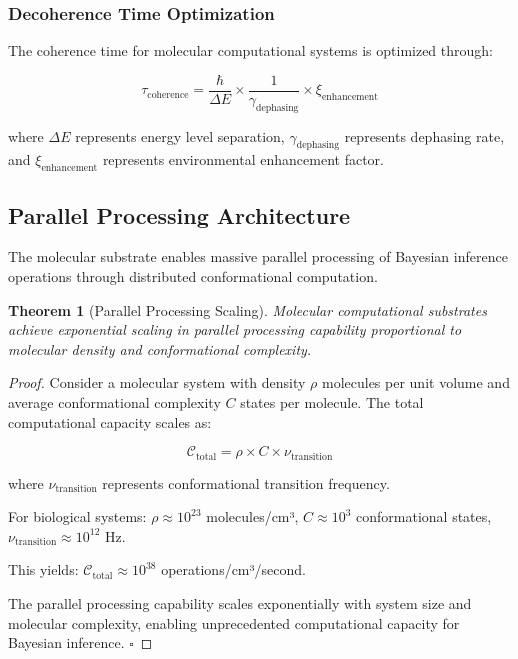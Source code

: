 \documentclass[12pt,a4paper]{article}
\newtheorem{theorem}{Theorem}[section]
\begin{document}
\subsubsection{Decoherence Time Optimization}

The coherence time for molecular computational systems is optimized through:

\begin{equation}
\tau_{\text{coherence}} = \frac{\hbar}{\Delta E} \times \frac{1}{\gamma_{\text{dephasing}}} \times \xi_{\text{enhancement}}
\end{equation}

where $\Delta E$ represents energy level separation, $\gamma_{\text{dephasing}}$ represents dephasing rate, and $\xi_{\text{enhancement}}$ represents environmental enhancement factor.

\subsection{Parallel Processing Architecture}

The molecular substrate enables massive parallel processing of Bayesian inference operations through distributed conformational computation.

\begin{theorem}[Parallel Processing Scaling]
Molecular computational substrates achieve exponential scaling in parallel processing capability proportional to molecular density and conformational complexity.
\end{theorem}

\begin{proof}
Consider a molecular system with density $\rho$ molecules per unit volume and average conformational complexity $C$ states per molecule. The total computational capacity scales as:

\begin{equation}
\mathcal{C}_{\text{total}} = \rho \times C \times \nu_{\text{transition}}
\end{equation}

where $\nu_{\text{transition}}$ represents conformational transition frequency.

For biological systems: $\rho \approx 10^{23}$ molecules/cm³, $C \approx 10^3$ conformational states, $\nu_{\text{transition}} \approx 10^{12}$ Hz.

This yields: $\mathcal{C}_{\text{total}} \approx 10^{38}$ operations/cm³/second.

The parallel processing capability scales exponentially with system size and molecular complexity, enabling unprecedented computational capacity for Bayesian inference. $\square$
\end{proof}
\end{document}
